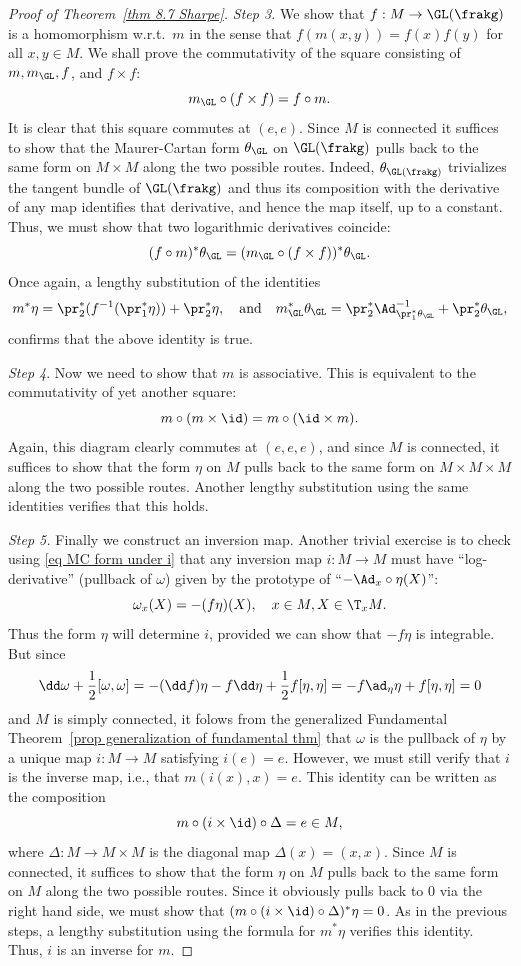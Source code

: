 \begin{proof}[Proof of Theorem~\ref{thm 8.7 Sharpe}]
    \emph{Step 3.} We show that $f:M\to \GL(\frakg)$ is a homomorphism w.r.t.\ $m$ in the sense that $f(m(x,y))=f(x)f(y)$ for all $x,y\in M$. We shall prove the commutativity of the square consisting of $m,m_{\GL},f$, and $f\times f$:
    \[m_{\GL}\circ (f\times f)=f\circ m.\]
    It is clear that this square commutes at $(e,e)$. Since $M$ is connected it suffices to show that the Maurer-Cartan form $\theta_{\GL}$ on $\GL(\frakg)$ pulls back to the same form on $M\times M$ along the two possible routes. Indeed, $\theta_{\GL(\frakg)}$ trivializes the tangent bundle of $\GL(\frakg)$ and thus its composition with the derivative of any map identifies that derivative, and hence the map itself, up to a constant. Thus, we must show that two logarithmic derivatives coincide:
    \[(f\circ m)^\ast\theta_{\GL}=(m_{\GL}\circ (f\times f))^\ast \theta_{\GL}.\]
    Once again, a lengthy substitution of the identities
    \[m^\ast\eta=\pr_2^\ast(f^{-1}(\pr_1^\ast\eta))+\pr_2^\ast\eta, \quad \text{and}\quad m_{\GL}^\ast\theta_{\GL}=\pr_2^\ast \Ad^{-1}_{\pr_1^\ast\theta_{\GL}}+\pr_2^\ast \theta_{\GL},\] confirms that the above identity is true.

    \emph{Step 4}. Now we need to show that $m$ is associative. This is equivalent to the commutativity of yet another square:
    \[m\circ (m\times \id)=m\circ (\id\times m).\]
    Again, this diagram clearly commutes at $(e,e,e)$, and since $M$ is connected, it suffices to show that the form $\eta$ on $M$ pulls back to the same form on $M\times M\times M$ along the two possible routes. Another lengthy substitution using the same identities verifies that this holds.

    \emph{Step 5.} Finally we construct an inversion map. Another trivial exercise is to check using \eqref{eq MC form under i} that any inversion map $i:M\to M$ must have ``log-derivative'' (pullback of $\omega$) given by the prototype of ``$-\Ad_x\circ \eta(X)$'':
    \[\omega_x(X)=-(f\eta)(X),\quad x\in M,X\in \T_x M.\]
    Thus the form $\eta$ will determine $i$, provided we can show that $-f\eta$ is integrable. But since
    \[\dd\omega+\frac12[\omega,\omega]=-(\dd f)\eta -f\dd \eta+\frac12 f[\eta,\eta]=-f\ad_\eta\eta +f[\eta,\eta]=0\]
    and $M$ is simply connected, it folows from the generalized Fundamental Theorem~\ref{prop generalization of fundamental thm} that $\omega$ is the pullback of $\eta$ by a unique map $i:M\to M$ satisfying $i(e)=e$. However, we must still verify that $i$ is the inverse map, i.e., that $m(i(x),x)=e$. This identity can be written as the composition
    \[m\circ(i\times\id)\circ\Delta=e\in M,\]
    where $\Delta:M\to M\times M$ is the diagonal map $\Delta(x)=(x,x)$. Since $M$ is connected, it suffices to show that the form $\eta$ on $M$ pulls back to the same form on $M$ along the two possible routes. Since it obviously pulls back to $0$ via the right hand side, we must show that $(m\circ(i\times\id)\circ\Delta)^\ast\eta=0$. As in the previous steps, a lengthy substitution using the formula for $m^\ast\eta$ verifies this identity. Thus, $i$ is an inverse for $m$.


\end{proof}
